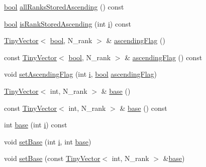 \begin{DoxyCompactItemize}
\item 
\hyperlink{compiler_8h_abb452686968e48b67397da5f97445f5b}{bool} \hyperlink{classGeneralArrayStorage_aa23ca79859fbdd82c8057badda855980}{all\+Ranks\+Stored\+Ascending} () const 
\item 
\hyperlink{compiler_8h_abb452686968e48b67397da5f97445f5b}{bool} \hyperlink{classGeneralArrayStorage_a966ece70ad6bd55a4073f98037d1fa90}{is\+Rank\+Stored\+Ascending} (int \hyperlink{indexexpr_8h_aabd77643995707c185e95c8cb2782c81}{i}) const 
\item 
\hyperlink{classTinyVector}{Tiny\+Vector}$<$ \hyperlink{compiler_8h_abb452686968e48b67397da5f97445f5b}{bool}, N\+\_\+rank $>$ \& \hyperlink{classGeneralArrayStorage_affa1b4235352c211cbbdb10c56e81b20}{ascending\+Flag} ()
\item 
const \hyperlink{classTinyVector}{Tiny\+Vector}$<$ \hyperlink{compiler_8h_abb452686968e48b67397da5f97445f5b}{bool}, N\+\_\+rank $>$ \& \hyperlink{classGeneralArrayStorage_a9322a672847be94c5660847c7dd4082f}{ascending\+Flag} () const 
\item 
void \hyperlink{classGeneralArrayStorage_a942076b8bf4610aa2aa1ab3321521e82}{set\+Ascending\+Flag} (int \hyperlink{indexexpr_8h_aabd77643995707c185e95c8cb2782c81}{i}, \hyperlink{compiler_8h_abb452686968e48b67397da5f97445f5b}{bool} \hyperlink{classGeneralArrayStorage_affa1b4235352c211cbbdb10c56e81b20}{ascending\+Flag})
\item 
\hyperlink{classTinyVector}{Tiny\+Vector}$<$ int, N\+\_\+rank $>$ \& \hyperlink{classGeneralArrayStorage_a2af4473b35e655688b6dd0e38d8ca2c9}{base} ()
\item 
const \hyperlink{classTinyVector}{Tiny\+Vector}$<$ int, N\+\_\+rank $>$ \& \hyperlink{classGeneralArrayStorage_a5f989115324a7418fb560044a35fd49c}{base} () const 
\item 
int \hyperlink{classGeneralArrayStorage_a7643e558dd4239cf0cba1c44691d8edc}{base} (int \hyperlink{indexexpr_8h_aabd77643995707c185e95c8cb2782c81}{i}) const 
\item 
void \hyperlink{classGeneralArrayStorage_acead8c074497f159e572d50b102ac41e}{set\+Base} (int \hyperlink{indexexpr_8h_aabd77643995707c185e95c8cb2782c81}{i}, int \hyperlink{classGeneralArrayStorage_a2af4473b35e655688b6dd0e38d8ca2c9}{base})
\item 
void \hyperlink{classGeneralArrayStorage_ac601a96a32228a4a250a4e28b08108d2}{set\+Base} (const \hyperlink{classTinyVector}{Tiny\+Vector}$<$ int, N\+\_\+rank $>$ \&\hyperlink{classGeneralArrayStorage_a2af4473b35e655688b6dd0e38d8ca2c9}{base})
\end{DoxyCompactItemize}
